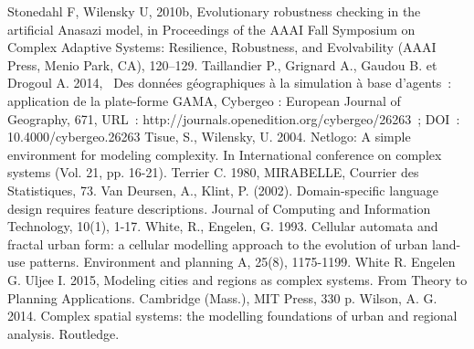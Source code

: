 \documentclass[10pt]{article}
\begin{document}







Stonedahl F, Wilensky U, 2010b, Evolutionary robustness checking in the artificial Anasazi model, in Proceedings of the AAAI Fall Symposium on Complex Adaptive Systems: Resilience, Robustness, and Evolvability (AAAI Press, Menio Park, CA), 120–129.
Taillandier P.,  Grignard A., Gaudou B. et Drogoul A. 2014,  Des données géographiques à la simulation à base d’agents : application de la plate-forme GAMA, Cybergeo : European Journal of Geography, 671, URL : http://journals.openedition.org/cybergeo/26263 ; DOI : 10.4000/cybergeo.26263
Tisue, S.,  Wilensky, U. 2004. Netlogo: A simple environment for modeling complexity. In International conference on complex systems (Vol. 21, pp. 16-21).
Terrier C. 1980, MIRABELLE, Courrier des Statistiques, 73.
Van Deursen, A.,  Klint, P. (2002). Domain-specific language design requires feature descriptions. Journal of Computing and Information Technology, 10(1), 1-17.
White, R.,  Engelen, G. 1993. Cellular automata and fractal urban form: a cellular modelling approach to the evolution of urban land-use patterns. Environment and planning A, 25(8), 1175-1199.
White R. Engelen G.  Uljee I. 2015, Modeling cities and regions as complex systems. From Theory to Planning Applications. Cambridge (Mass.), MIT Press, 330 p.
Wilson, A. G. 2014. Complex spatial systems: the modelling foundations of urban and regional analysis. Routledge.
\end{document}

